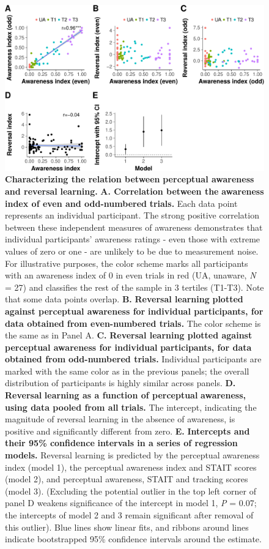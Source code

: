 \documentclass[12pt]{article}
\begin{document}
\clearpage
\begin{figure}[htbp]
\centering
\includegraphics[width=1.0\textwidth]{cfs_regressions-crop.pdf}
\caption{\label{fig:orgd1537f6}
\textbf{Characterizing the relation between} \textbf{perceptual awareness and reversal} \textbf{learning.} \textbf{A. Correlation between the} \textbf{awareness index of even and odd-numbered} \textbf{trials.} Each data point represents an individual participant. The strong positive correlation between these independent measures of awareness demonstrates that individual participants' awareness ratings - even those with extreme values of zero or one - are unlikely to be due to measurement noise. For illustrative purposes, the color scheme marks all participants with an awareness index of 0 in even trials in red (UA, unaware, \emph{N} = 27) and classifies the rest of the sample in 3 tertiles (T1-T3). Note that some data points overlap. \textbf{B.} \textbf{Reversal learning} \textbf{plotted against perceptual awareness for} \textbf{individual participants, for data obtained} \textbf{from even-numbered trials.} The color scheme is the same as in Panel A. \textbf{C.} \textbf{Reversal learning plotted against} \textbf{perceptual awareness for individual} \textbf{participants, for data obtained from} \textbf{odd-numbered trials.} Individual participants are marked with the same color as in the previous panels; the overall distribution of participants is highly similar across panels. \textbf{D.} \textbf{Reversal} \textbf{learning as a function of perceptual} \textbf{awareness, using data pooled from all} \textbf{trials.} The intercept, indicating the magnitude of reversal learning in the absence of awareness, is positive and significantly different from zero. \textbf{E.} \textbf{Intercepts and their 95\% confidence} \textbf{intervals in a series of regression} \textbf{models.} Reversal learning is predicted by the perceptual awareness index (model 1), the perceptual awareness index and STAIT scores (model 2), and perceptual awareness, STAIT and tracking scores (model 3). (Excluding the potential outlier in the top left corner of panel D weakens significance of the intercept in model 1, \emph{P} = 0.07; the intercepts of model 2 and 3 remain significant after removal of this outlier). Blue lines show linear fits, and ribbons around lines indicate bootstrapped 95\% confidence intervals around the estimate.}
\end{figure}
\end{document}
